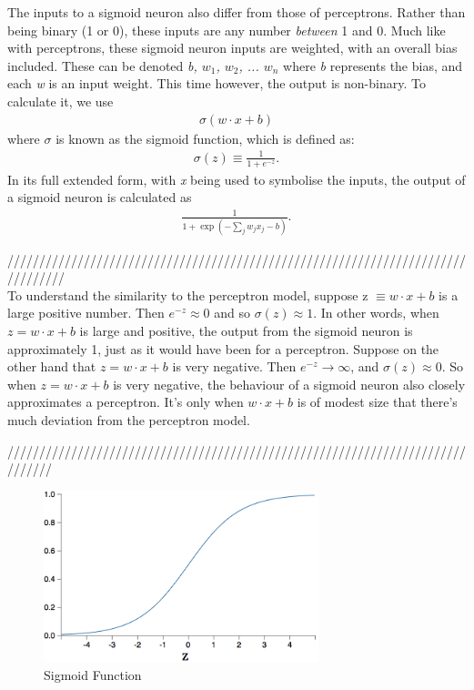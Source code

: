 \documentclass[12pt,a4paper]{article}
\begin{document}
The inputs to a sigmoid neuron also differ from those of perceptrons. Rather than being binary (1 or 0), these inputs are any number \textit{between} 1 and 0. %
Much like with perceptrons, these sigmoid neuron inputs are weighted, with an overall bias included. These can be denoted \textit{b, $w_1$, $w_2$, ... $w_n$}
where \textit{b} represents the bias, and each \textit{w} is an input weight. This time however, the output is non-binary. To calculate it, we use 
\begin{eqnarray}
\sigma (w \cdot x+b)
\end{eqnarray}
where $\sigma$ is known as the sigmoid function, which is defined as:
\begin{eqnarray} 
\sigma(z) \equiv \frac{1}{1+e^{-z}}.
\end{eqnarray}
In its full extended form, with \textit{x} being used to symbolise the inputs, the output of a sigmoid neuron is calculated as
\begin{eqnarray} 
\frac{1}{1+\exp(-\sum_j w_j x_j-b)}.
\end{eqnarray}

/////////////////////////////////////////////////////////////////////////////////\\
To understand the similarity to the perceptron model, suppose 
z $\equiv w \cdot x + b$ is a large positive number. Then 
$e^{-z} \approx 0$ and so $\sigma(z) \approx 1$. In other words, when $z = w \cdot x+b$ is large and positive, the output from the sigmoid neuron is approximately 1, just as it would have been for a perceptron. Suppose on the other hand that $z = w \cdot x+b$ is very negative. Then $e^{-z} \rightarrow \infty$, and $\sigma(z) \approx 0$. So when 
$z = w \cdot x +b$ is very negative, the behaviour of a sigmoid neuron also closely approximates a perceptron. It's only when 
$w \cdot x+b$ is of modest size that there's much deviation from the perceptron model\citep{NeuralNetworksAndDeepLearning}.

///////////////////////////////////////////////////////////////////////////////

\begin{figure}[h]
	\includegraphics[width=\textwidth, height=5cm]{SigmoidFunction.png}
	\caption{Sigmoid Function}
\end{figure}
\end{document}
